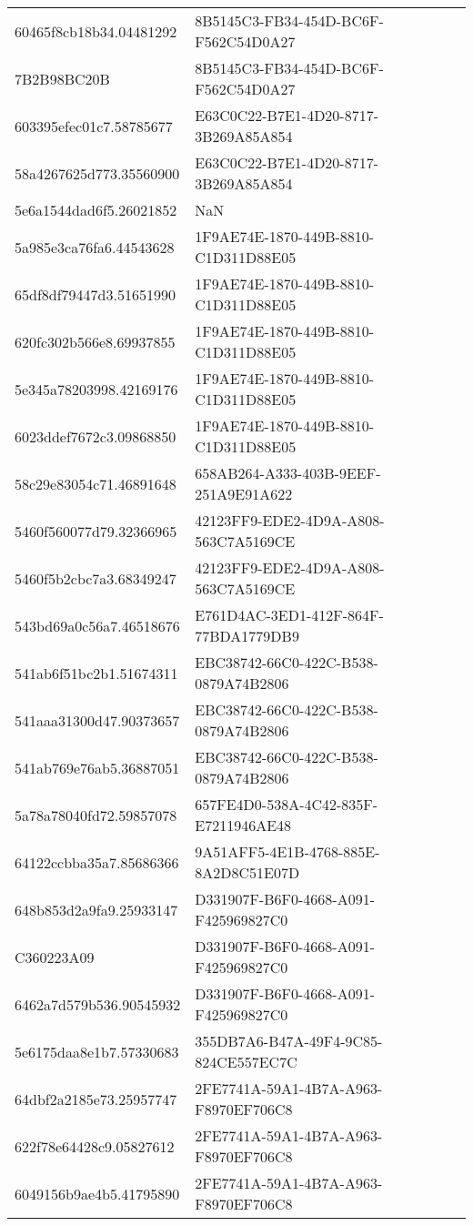 \begin{tabular}{ll}
60465f8cb18b34.04481292 & 8B5145C3-FB34-454D-BC6F-F562C54D0A27 \\
7B2B98BC20B & 8B5145C3-FB34-454D-BC6F-F562C54D0A27 \\
603395efec01c7.58785677 & E63C0C22-B7E1-4D20-8717-3B269A85A854 \\
58a4267625d773.35560900 & E63C0C22-B7E1-4D20-8717-3B269A85A854 \\
5e6a1544dad6f5.26021852 & NaN \\
5a985e3ca76fa6.44543628 & 1F9AE74E-1870-449B-8810-C1D311D88E05 \\
65df8df79447d3.51651990 & 1F9AE74E-1870-449B-8810-C1D311D88E05 \\
620fc302b566e8.69937855 & 1F9AE74E-1870-449B-8810-C1D311D88E05 \\
5e345a78203998.42169176 & 1F9AE74E-1870-449B-8810-C1D311D88E05 \\
6023ddef7672c3.09868850 & 1F9AE74E-1870-449B-8810-C1D311D88E05 \\
58c29e83054c71.46891648 & 658AB264-A333-403B-9EEF-251A9E91A622 \\
5460f560077d79.32366965 & 42123FF9-EDE2-4D9A-A808-563C7A5169CE \\
5460f5b2cbc7a3.68349247 & 42123FF9-EDE2-4D9A-A808-563C7A5169CE \\
543bd69a0c56a7.46518676 & E761D4AC-3ED1-412F-864F-77BDA1779DB9 \\
541ab6f51bc2b1.51674311 & EBC38742-66C0-422C-B538-0879A74B2806 \\
541aaa31300d47.90373657 & EBC38742-66C0-422C-B538-0879A74B2806 \\
541ab769e76ab5.36887051 & EBC38742-66C0-422C-B538-0879A74B2806 \\
5a78a78040fd72.59857078 & 657FE4D0-538A-4C42-835F-E7211946AE48 \\
64122ccbba35a7.85686366 & 9A51AFF5-4E1B-4768-885E-8A2D8C51E07D \\
648b853d2a9fa9.25933147 & D331907F-B6F0-4668-A091-F425969827C0 \\
C360223A09 & D331907F-B6F0-4668-A091-F425969827C0 \\
6462a7d579b536.90545932 & D331907F-B6F0-4668-A091-F425969827C0 \\
5e6175daa8e1b7.57330683 & 355DB7A6-B47A-49F4-9C85-824CE557EC7C \\
64dbf2a2185e73.25957747 & 2FE7741A-59A1-4B7A-A963-F8970EF706C8 \\
622f78e64428c9.05827612 & 2FE7741A-59A1-4B7A-A963-F8970EF706C8 \\
6049156b9ae4b5.41795890 & 2FE7741A-59A1-4B7A-A963-F8970EF706C8 \\

\end{tabular}
